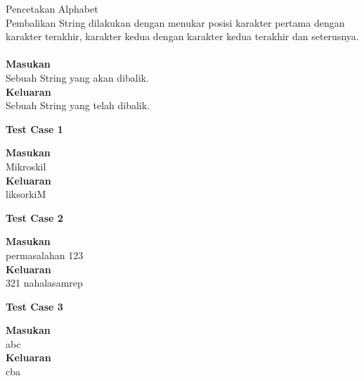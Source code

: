 \begin{permasalahan}{Pencetakan Alphabet}\\
Pembalikan String dilakukan dengan menukar posisi karakter pertama dengan karakter terakhir, karakter kedua dengan karakter kedua terakhir dan seterusnya.\\
	\\
	\textbf{Masukan}\\
	Sebuah String yang akan dibalik.\\
	\textbf{Keluaran}\\
	Sebuah String yang telah dibalik.\\
	\begin{center}
	\textbf{Test Case 1}\\
	\end{center}
	\textbf{Masukan}\\
	Mikroskil\\
	\textbf{Keluaran}\\
	liksorkiM\\
	\begin{center}
	\textbf{Test Case 2}\\
	\end{center}
	\textbf{Masukan}\\
	permasalahan 123\\
	\textbf{Keluaran}\\
	321 nahalasamrep\\
	\begin{center}
	\textbf{Test Case 3}\\
	\end{center}
	\textbf{Masukan}\\
	abc\\
	\textbf{Keluaran}\\
	cba\\
\end{permasalahan}

\newpage


